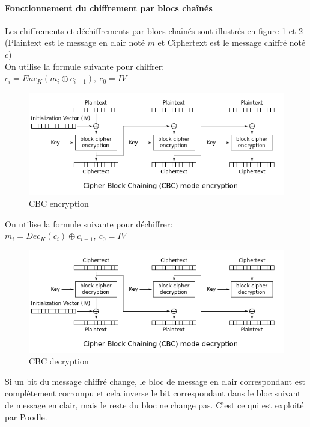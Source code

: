 \paragraph{Fonctionnement du chiffrement par blocs cha\^inés}

Les chiffrements et déchiffrements par blocs cha\^inés sont illustrés en figure \ref{cbc-enc} et \ref{cbc-dec} (Plaintext est le message en clair noté $m$ et Ciphertext est le message chiffré noté $c$) \\

\noindent On utilise la formule suivante pour chiffrer: \\
$c_i = Enc_K(m_i \oplus c_{i-1}),\ c_0 = IV$

\begin{figure}[H]
\includegraphics[scale=0.6]{img/cbc-enc.png}
\caption{CBC encryption}
\label{cbc-enc}
\end{figure}

\noindent On utilise la formule suivante pour déchiffrer: \\
$m_i = Dec_K(c_i) \oplus c_{i-1},\ c_0 = IV$ 

\begin{figure}[H]
\includegraphics[scale=0.6]{img/cbc-dec.png}
\caption{CBC decryption}
\label{cbc-dec}
\end{figure}

Si un bit du message chiffré change, le bloc de message en clair correspondant est complètement corrompu et cela inverse le bit correspondant dans le bloc suivant de message en clair, mais le reste du bloc ne change pas. C'est ce qui est exploité par Poodle.

